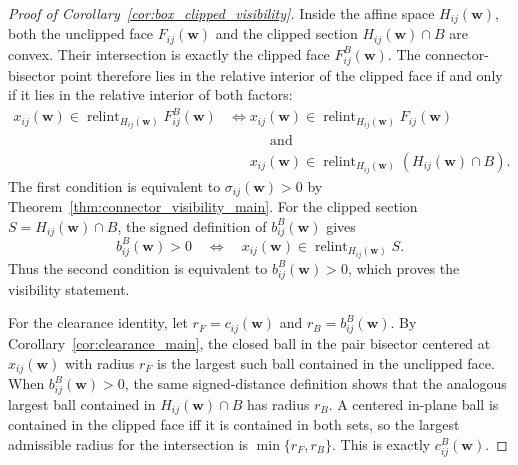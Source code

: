 \documentclass[preprint,12pt]{elsarticle}
\newcommand{\weights}{\mathbf{w}}
\newcommand{\relint}{\operatorname{relint}}
\begin{document}
\begin{proof}[Proof of Corollary~\ref{cor:box_clipped_visibility}]
Inside the affine space $H_{ij}(\weights)$, both the unclipped face
$F_{ij}(\weights)$ and the clipped section $H_{ij}(\weights)\cap B$ are convex.
Their intersection is exactly the clipped face $F_{ij}^B(\weights)$. The
connector-bisector point therefore lies in the relative interior of the clipped
face if and only if it lies in the relative interior of both factors:
\begin{equation}
\begin{aligned}
    x_{ij}(\weights)\in \operatorname{relint}_{H_{ij}(\weights)} F_{ij}^B(\weights)
    &\Longleftrightarrow
    x_{ij}(\weights)\in\relint_{H_{ij}(\weights)} F_{ij}(\weights) \\
    &\phantom{\Longleftrightarrow}\qquad \text{and} \\
    &\phantom{\Longleftrightarrow}
    x_{ij}(\weights)\in\operatorname{relint}_{H_{ij}(\weights)}(H_{ij}(\weights)\cap B).
\end{aligned}
\end{equation}
The first condition is equivalent to $\sigma_{ij}(\weights)>0$ by
Theorem~\ref{thm:connector_visibility_main}. For the clipped section
$S=H_{ij}(\weights)\cap B$, the signed definition of $b_{ij}^B(\weights)$ gives
\begin{equation}
    b_{ij}^B(\weights)>0
    \quad\Longleftrightarrow\quad
    x_{ij}(\weights)\in\operatorname{relint}_{H_{ij}(\weights)} S.
\end{equation}
Thus the second condition is equivalent to $b_{ij}^B(\weights)>0$, which proves
the visibility statement.

For the clearance identity, let $r_F=c_{ij}(\weights)$ and
$r_B=b_{ij}^B(\weights)$. By Corollary~\ref{cor:clearance_main}, the closed
ball in the pair bisector centered at $x_{ij}(\weights)$ with radius $r_F$ is
the largest such ball contained in the unclipped face. When
$b_{ij}^B(\weights)>0$, the same signed-distance definition shows that the
analogous largest ball contained in $H_{ij}(\weights)\cap B$ has radius $r_B$.
A centered in-plane ball is contained in the clipped face iff it is contained
in both sets, so the largest admissible radius for the intersection is
$\min\{r_F,r_B\}$. This is exactly $c_{ij}^B(\weights)$.
\end{proof}
\end{document}
